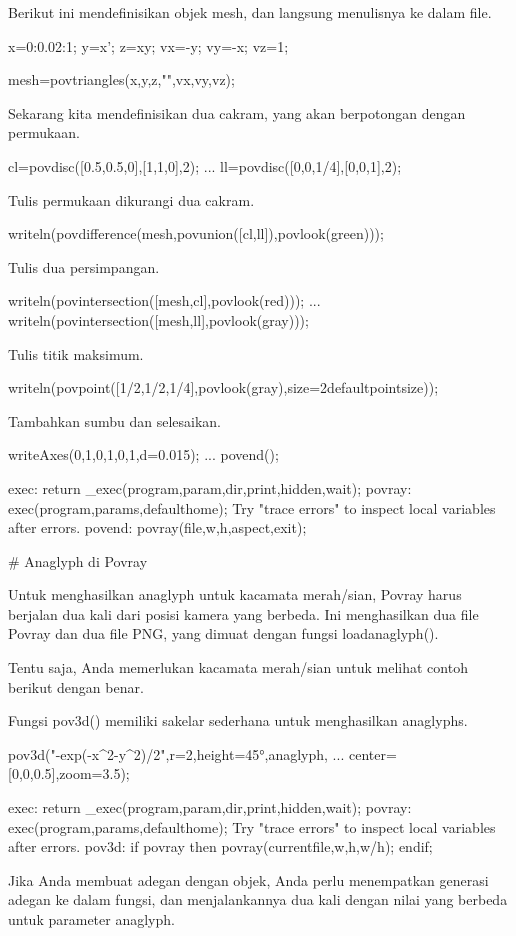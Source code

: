 \documentclass{article}
\begin{document}
Berikut ini mendefinisikan objek mesh, dan langsung menulisnya ke
dalam file.


\>x=0:0.02:1; y=x'; z=x\*y; vx=-y; vy=-x; vz=1;

\>mesh=povtriangles(x,y,z,"",vx,vy,vz);


Sekarang kita mendefinisikan dua cakram, yang akan berpotongan dengan
permukaan.


\>cl=povdisc([0.5,0.5,0],[1,1,0],2); ...  
\>   ll=povdisc([0,0,1/4],[0,0,1],2);


Tulis permukaan dikurangi dua cakram.


\>writeln(povdifference(mesh,povunion([cl,ll]),povlook(green)));


Tulis dua persimpangan.


\>writeln(povintersection([mesh,cl],povlook(red))); ...  
\>   writeln(povintersection([mesh,ll],povlook(gray)));


Tulis titik maksimum.


\>writeln(povpoint([1/2,1/2,1/4],povlook(gray),size=2\*defaultpointsize));


Tambahkan sumbu dan selesaikan.


\>writeAxes(0,1,0,1,0,1,d=0.015); ...  
\>   povend();


    exec:
        return _exec(program,param,dir,print,hidden,wait);
    povray:
        exec(program,params,defaulthome);
    Try "trace errors" to inspect local variables after errors.
    povend:
        povray(file,w,h,aspect,exit); 

# Anaglyph di Povray

Untuk menghasilkan anaglyph untuk kacamata merah/sian, Povray harus
berjalan dua kali dari posisi kamera yang berbeda. Ini menghasilkan
dua file Povray dan dua file PNG, yang dimuat dengan fungsi
loadanaglyph().


Tentu saja, Anda memerlukan kacamata merah/sian untuk melihat contoh
berikut dengan benar.


Fungsi pov3d() memiliki sakelar sederhana untuk menghasilkan
anaglyphs.


\>pov3d("-exp(-x^2-y^2)/2",r=2,height=45°,\>anaglyph, ...  
\>     center=[0,0,0.5],zoom=3.5);


    exec:
        return _exec(program,param,dir,print,hidden,wait);
    povray:
        exec(program,params,defaulthome);
    Try "trace errors" to inspect local variables after errors.
    pov3d:
        if povray then povray(currentfile,w,h,w/h); endif;

Jika Anda membuat adegan dengan objek, Anda perlu menempatkan generasi
adegan ke dalam fungsi, dan menjalankannya dua kali dengan nilai yang
berbeda untuk parameter anaglyph.
\end{document}
